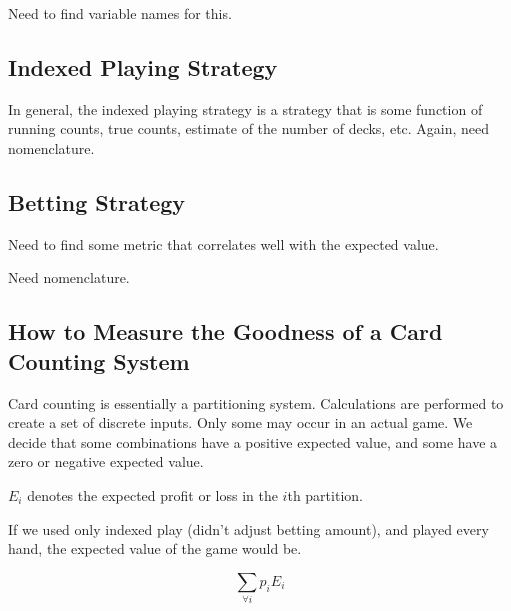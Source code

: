 Need to find variable names for this.


\subsection{Indexed Playing Strategy}
\label{cmct0:sctp0:sips0}

In general, the indexed playing strategy is a strategy that is some function of
running counts, true counts, estimate of the number of decks, etc.  Again,
need nomenclature.


\subsection{Betting Strategy}
\label{cmct0:sctp0:sibs0}

Need to find some metric that correlates well with the expected value.

Need nomenclature.


\subsection{How to Measure the Goodness of a Card Counting System}
\label{cmct0:sctp0:sgcs0}

Card counting is essentially a partitioning system.  Calculations are performed
to create a set of discrete inputs.  Only some may occur in an actual game.
We decide that some combinations have a positive expected value, and some have a
zero or negative expected value.

$E_i$ denotes the expected profit or loss in the $i$th partition.

If we used only indexed play (didn't adjust betting amount), and played every hand,
the expected value of the game would be.

\begin{equation}
\label{eq:cmct0:sctp0:sgcs0:01}
\sum_{\forall i} p_i E_i
\end{equation}

